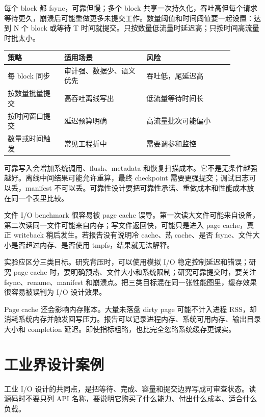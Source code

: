每个 block 都 fsync，可靠但慢；多个 block 共享一次持久化，吞吐高但每个请求等待更久，崩溃后可能重做更多未提交工作。数量阈值和时间阈值要一起设置：达到 N 个 block 或等待 T 时间就提交。只按数量低流量时延迟高；只按时间高流量时批太小。

\begin{center}
\begin{tabular}{p{0.22\linewidth}p{0.32\linewidth}p{0.34\linewidth}}
\toprule
策略 & 适用场景 & 风险 \\
\midrule
每 block 同步 & 审计强、数据少、语义优先 & 吞吐低，尾延迟高 \\
按数量批量提交 & 高吞吐离线写出 & 低流量等待时间长 \\
按时间窗口提交 & 延迟预算明确 & 高流量批次可能偏小 \\
数量或时间触发 & 常见工程折中 & 需要调参和监控 \\
\bottomrule
\end{tabular}
\end{center}

可靠写入会增加系统调用、flush、metadata 和恢复扫描成本。它不是无条件越强越好。离线中间结果可能允许重算，最终 checkpoint 需要更强提交；调试日志可以丢，manifest 不可以丢。可靠性设计要把可靠性承诺、重做成本和性能成本放在同一个表里比较。

文件 I/O benchmark 很容易被 page cache 误导。第一次读大文件可能来自设备，第二次读同一文件可能来自内存；写文件返回快，可能只是进入 page cache，真正 writeback 稍后发生。若报告没有说明冷 cache、热 cache、是否 fsync、文件大小是否超过内存、是否使用 tmpfs，结果就无法解释。

实验应区分三类目标。研究背压时，可以使用模拟 I/O 稳定控制延迟和错误；研究 page cache 时，要明确预热、文件大小和系统限制；研究可靠提交时，要关注 fsync、rename、manifest 和崩溃点。把三类目标混在同一张性能图里，缓存效果很容易被误判为 I/O 设计效果。

Page cache 还会影响内存账本。大量未落盘 dirty page 可能不计入进程 RSS，却消耗系统内存并触发回写压力。报告可以记录进程内存、系统可用内存、输出目录大小和 completion 延迟。即使指标粗略，也比完全忽略系统缓存更诚实。

\section{工业界设计案例}

工业 I/O 设计的共同点，是把等待、完成、容量和提交边界写成可审查状态。读源码时不要只列 API 名称，要说明它购买了什么能力、付出什么成本、适合什么负载。

